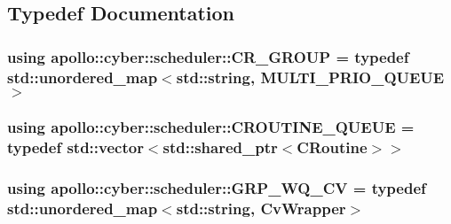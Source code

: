 \subsection{Typedef Documentation}
\hypertarget{namespaceapollo_1_1cyber_1_1scheduler_aea5742ba3cc52566de1eeeeaac1a8714}{
\subsubsection[{C\-R\-\_\-\-G\-R\-O\-U\-P}]{\setlength{\rightskip}{0pt plus 5cm}using {\bf apollo\-::cyber\-::scheduler\-::\-C\-R\-\_\-\-G\-R\-O\-U\-P} = typedef std\-::unordered\-\_\-map$<$std\-::string, {\bf M\-U\-L\-T\-I\-\_\-\-P\-R\-I\-O\-\_\-\-Q\-U\-E\-U\-E}$>$}}\label{namespaceapollo_1_1cyber_1_1scheduler_aea5742ba3cc52566de1eeeeaac1a8714}
\hypertarget{namespaceapollo_1_1cyber_1_1scheduler_a9785cbbdaf553a63e7ecb89e007326e5}{
\subsubsection[{C\-R\-O\-U\-T\-I\-N\-E\-\_\-\-Q\-U\-E\-U\-E}]{\setlength{\rightskip}{0pt plus 5cm}using {\bf apollo\-::cyber\-::scheduler\-::\-C\-R\-O\-U\-T\-I\-N\-E\-\_\-\-Q\-U\-E\-U\-E} = typedef std\-::vector$<$std\-::shared\-\_\-ptr$<${\bf C\-Routine}$>$$>$}}\label{namespaceapollo_1_1cyber_1_1scheduler_a9785cbbdaf553a63e7ecb89e007326e5}
\hypertarget{namespaceapollo_1_1cyber_1_1scheduler_aaaf29077b955c494a8b6ef756e02ed4d}{
\subsubsection[{G\-R\-P\-\_\-\-W\-Q\-\_\-\-C\-V}]{\setlength{\rightskip}{0pt plus 5cm}using {\bf apollo\-::cyber\-::scheduler\-::\-G\-R\-P\-\_\-\-W\-Q\-\_\-\-C\-V} = typedef std\-::unordered\-\_\-map$<$std\-::string, {\bf Cv\-Wrapper}$>$}}\label{namespaceapollo_1_1cyber_1_1scheduler_aaaf29077b955c494a8b6ef756e02ed4d}
